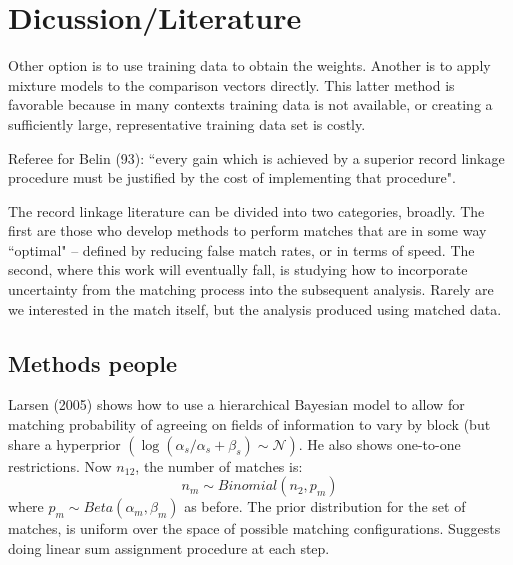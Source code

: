 \documentclass[11pt,reqno]{amsart}
\begin{document}
\section{Dicussion/Literature}

Other option is to use training data to obtain the weights.  Another is to apply mixture models to the comparison vectors directly.  This latter method is favorable because in many contexts training data is not available, or creating a sufficiently large, representative training data set is costly.  

Referee for Belin (93): ``every gain which is achieved by a superior record linkage procedure must be justified by the cost of implementing that procedure". 


The record linkage literature can be divided into two categories, broadly.  The first are those who develop methods to perform matches that are in some way ``optimal" -- defined by reducing false match rates, or in terms of speed.  The second, where this work will eventually fall, is studying how to incorporate uncertainty from the matching process into the subsequent analysis.  Rarely are we interested in the match itself, but the analysis produced using matched data.  
\subsection{Methods people}
Larsen (2005) shows how to use a hierarchical Bayesian model to allow for matching probability of agreeing on fields of information to vary by block (but share a hyperprior $(\log(\alpha_s/\alpha_s+\beta_s) \sim \mathcal{N})$.  He also shows one-to-one restrictions.  Now $n_{12}$, the number of matches is:
\[ n_{m} \sim Binomial(n_2, p_m) \] 
where $p_m \sim Beta(\alpha_m, \beta_m)$ as before. The prior distribution for the set of matches, is uniform over the space of possible matching configurations. Suggests doing linear sum assignment procedure at each step.  %
\end{document}
